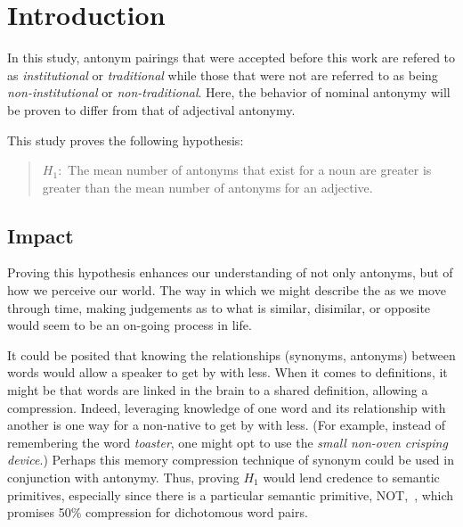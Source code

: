 \section {Introduction}%
In this study, antonym pairings that were accepted before this work are refered to as \textit{institutional} or \textit{traditional} while those that were not are referred to as being \textit{non-institutional} or \textit{non-traditional}. Here, the behavior of nominal antonymy will be proven to differ from that of adjectival antonymy.  


This study proves the following hypothesis:
	\begin{quote}
		$H_{1}:$ The mean number of antonyms that exist for a noun are greater is greater than the mean number of antonyms for an adjective.
%
	\end{quote}

\subsection{Impact}
Proving this hypothesis enhances our understanding of not only antonyms, but of how we perceive our world.  The way in which we might describe the as we move through time, making judgements as to what is similar, disimilar, or opposite would seem to be an on-going process in life.

It could be posited that knowing the relationships (synonyms, antonyms) between words would allow a speaker to get by with less. When it comes to definitions, it might be that words are linked in the brain to a shared definition, allowing a compression.  Indeed, leveraging knowledge of one word and its relationship with another is one way for a non-native to get by with less.  (For example, instead of remembering the word \textit {toaster}, one might opt to use the \textit {small non-oven crisping device}\footnotemark.)  Perhaps this memory compression technique of synonym could be used in conjunction with antonymy.  Thus, proving $H_{1}$ would lend credence to semantic primitives, especially since there is a particular semantic primitive, NOT\footnotemark,~\cite{Wierzbicka}, which promises 50\% compression for dichotomous word pairs.

